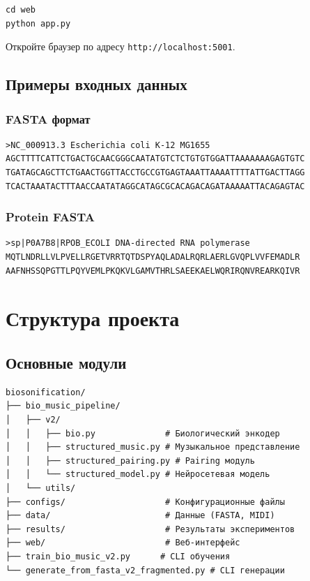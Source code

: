 \begin{verbatim}
cd web
python app.py
\end{verbatim}

Откройте браузер по адресу \texttt{http://localhost:5001}.

\subsection{Примеры входных данных}

\subsubsection{FASTA формат}

\begin{verbatim}
>NC_000913.3 Escherichia coli K-12 MG1655
AGCTTTTCATTCTGACTGCAACGGGCAATATGTCTCTGTGTGGATTAAAAAAAGAGTGTC
TGATAGCAGCTTCTGAACTGGTTACCTGCCGTGAGTAAATTAAAATTTTATTGACTTAGG
TCACTAAATACTTTAACCAATATAGGCATAGCGCACAGACAGATAAAAATTACAGAGTAC
\end{verbatim}

\subsubsection{Protein FASTA}

\begin{verbatim}
>sp|P0A7B8|RPOB_ECOLI DNA-directed RNA polymerase
MQTLNDRLLVLPVELLRGETVRRTQTDSPYAQLADALRQRLAERLGVQPLVVFEMADLR
AAFNHSSQPGTTLPQYVEMLPKQKVLGAMVTHRLSAEEKAELWQRIRQNVREARKQIVR
\end{verbatim}

\section{Структура проекта}

\subsection{Основные модули}

\begin{verbatim}
biosonification/
├── bio_music_pipeline/
│   ├── v2/
│   │   ├── bio.py              # Биологический энкодер
│   │   ├── structured_music.py # Музыкальное представление
│   │   ├── structured_pairing.py # Pairing модуль
│   │   └── structured_model.py # Нейросетевая модель
│   └── utils/
├── configs/                    # Конфигурационные файлы
├── data/                       # Данные (FASTA, MIDI)
├── results/                    # Результаты экспериментов
├── web/                        # Веб-интерфейс
├── train_bio_music_v2.py      # CLI обучения
└── generate_from_fasta_v2_fragmented.py # CLI генерации
\end{verbatim}


